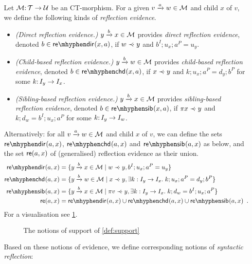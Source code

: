 \begin{definition}\label{def:support}
Let ${\mathcal{M}}{:}\, {\mathcal{T}}\rightarrow{\mathcal{U}}$ be an CT-morphism. For a given ${v}\xrightarrow{a}{w}\in{\mathcal{M}}$ and child $x$ of $v$, we define the following kinds of \emph{reflection evidence}.
\begin{itemize}[topsep=\smallskipamount]
\item \emph{(Direct reflection evidence.)} ${y}\xrightarrow{b}{x}\in{\mathcal{M}}$ provides \emph{direct reflection evidence}, denoted $\issdir b{x,a}$, if $w\mathrel{\prec\mskip-8mu\cdot} y$ and $b^I;u_x;a^P=u_y$.
\item \emph{(Child-based reflection evidence.)} ${y}\xrightarrow{b}{w}\in{\mathcal{M}}$ provides \emph{child-based reflection evidence}, denoted $\isschd b{x,a}$, if $x\mathrel{\prec\mskip-8mu\cdot} y$ and $k;u_x;a^P=d_y;b^P$ for some $k{:}\, I_y\rightarrow I_x$.
\item \emph{(Sibling-based reflection evidence.)} ${y}\xrightarrow{b}{x}\in{\mathcal{M}}$  provides \emph{sibling-based reflection evidence}, denoted $\isssib b{x,a}$, if $\pi{x}\mathrel{\prec\mskip-8mu\cdot} y$ and $k;d_w=b^I;u_x;a^P$ for some $k{:}\, I_y\rightarrow I_w$.
\end{itemize}
\end{definition}
%
Alternatively: for all ${v}\xrightarrow{a}{w}\in{\mathcal{M}}$ and child $x$ of $v$, we can define the sets $\sdir{a,x}$, $\schd{a,x}$ and $\ssib{a,x}$ as below, and the set $\mathsf{re}(a,x)$ of (generalised) reflection evidence as their union.
%
\begin{align*}
\sdir{a,x} ={} & \gensetof{\trip ybx\in \cM}{w\parentof y, b^I;u_x;a^P=u_y} \\
\schd{a,x} ={} & \gensetof{\trip ybw\in \cM}{x\parentof y, \exists k:I_y\to I_x\st k;u_x;a^P=d_y;b^P} \\
\ssib{a,x} ={} & \gensetof{\trip ybx\in \cM}{\parent v\parentof y, \exists k:I_y\to I_x\st k;d_w=b^I;u_x;a^P} \\
\re{a,x} ={} & \sdir{a,x}\cup \schd{a,x} \cup \ssib{a,x} \enspace.
\end{align*}
%
For a visualisation see \cref{fig:source-support}.
%
\begin{figure}
	
	\caption{The notions of support of \cref{def:support}}
	\label{fig:source-support}
\end{figure}
%
Based on these notions of evidence, we define corresponding notions of \emph{syntactic reflection}:

